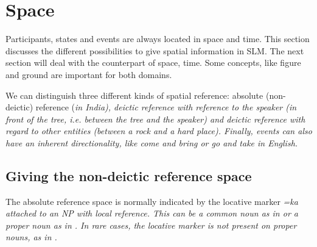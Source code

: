 %
%

\section{Space}\label{sec:func:Space}
Participants, states and events are always located in space and time. This section discusses the different possibilities to give spatial information in SLM. The next section will deal with the counterpart of space, time. Some concepts, like figure and ground are important for both domains.

We can distinguish three different kinds of spatial reference: absolute (non-deictic) reference (\em in India\em), deictic reference with reference to the speaker (\em in front of the tree\em, i.e. between the tree and the speaker) and deictic reference with regard to other entities (\em between a rock and a hard place\em). Finally, events can also have an inherent directionality, like \em come and bring \em or \em go and take \em in English.

\subsection{Giving the non-deictic reference space}\label{sec:func:Givingthenon-deicticreferencespace}
The absolute reference space is normally indicated  by the locative marker \em =ka \em {} attached to an NP with local reference.  This can be a common noun as in  or a proper noun as in . In rare cases, the locative marker is not present on proper nouns, as in .


